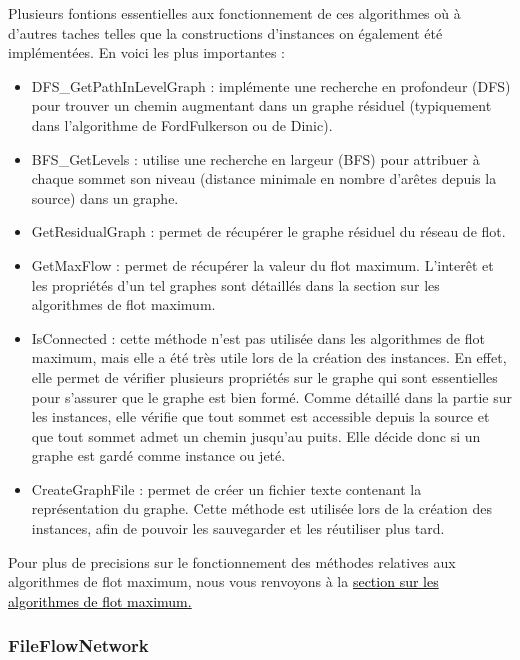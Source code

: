 \documentclass[a4paper]{article}
\begin{document}
Plusieurs fontions essentielles aux fonctionnement de ces algorithmes où à d'autres taches telles que la constructions d'instances on également été implémentées. En voici les plus importantes :
\begin{itemize}
	\item \textcolor{green!60!black}{DFS\_GetPathInLevelGraph} : implémente une recherche en profondeur (DFS) pour trouver un chemin augmentant dans un graphe résiduel (typiquement dans l'algorithme de FordFulkerson ou de Dinic).
	\item \textcolor{green!60!black}{BFS\_GetLevels} : utilise une recherche en largeur (BFS) pour attribuer à chaque sommet son niveau (distance minimale en nombre d’arêtes depuis la source) dans un graphe.
	\item \textcolor{green!60!black}{GetResidualGraph} : permet de récupérer le graphe résiduel du réseau de flot.
	\item \textcolor{green!60!black}{GetMaxFlow} : permet de récupérer la valeur du flot maximum. L'interêt et les propriétés d'un tel graphes sont détaillés dans la section sur les algorithmes de flot maximum.
	\item \textcolor{green!60!black}{IsConnected} : cette méthode n'est pas utilisée dans les algorithmes de flot maximum, mais elle a été très utile lors de la création des instances. En effet, elle permet de vérifier plusieurs propriétés sur le graphe qui sont essentielles pour s'assurer que le graphe est \og{}bien formé\fg{}. Comme détaillé dans la partie sur les instances, elle vérifie que tout sommet est accessible depuis la source et que tout sommet admet un chemin jusqu'au puits. Elle décide donc si un graphe est gardé comme instance ou jeté.
	\item \textcolor{green!60!black}{CreateGraphFile} : permet de créer un fichier texte contenant la représentation du graphe. Cette méthode est utilisée lors de la création des instances, afin de pouvoir les sauvegarder et les réutiliser plus tard.
\end{itemize}
Pour plus de precisions sur le fonctionnement des méthodes relatives aux algorithmes de flot maximum, nous vous renvoyons à la \hyperref[sec:algos]{\textcolor{black}{section sur les algorithmes de flot maximum.}}

\subsubsection{FileFlowNetwork}
\end{document}
